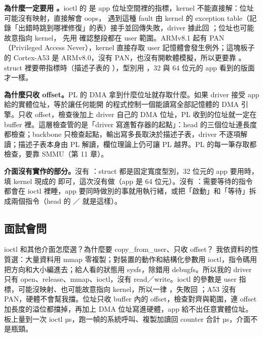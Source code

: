 \textbf{為什麼一定要用 。}ioctl 的  是 app 位址空間裡的指標，kernel 不能直接解：位址可能沒有映射，直接解會 oops， 遇到這種 fault 由 kernel 的 exception table（記錄「出錯時跳到哪裡修復」的表）接手並回傳失敗，driver 據此回 ；位址也可能故意指向 kernel， 先用  確認整段都在 user 範圍。ARMv8.1 起有 PAN（Privileged Access Never），kernel 直接存取 user 記憶體會發生例外；這塊板子的 Cortex-A53 是 ARMv8.0，沒有 PAN，也沒有開軟體模擬，所以更要靠 。struct 裡要帶指標時（描述子表的 ），型別用 ，32 與 64 位元的 app 看到的版面才一樣。

\textbf{為什麼只收 offset。}PL 的 DMA 拿到什麼位址就存取什麼。如果 driver 接受 app 給的實體位址，等於讓任何能開  的程式控制一個能讀寫全部記憶體的 DMA 引擎。只收 offset，檢查後加上 driver 自己的 DMA 位址，PL 收到的位址就一定在 buffer 裡。這層檢查管的是「driver 寫進暫存器的起點」：head 的三個位址連長度都檢查；backbone 只檢查起點，輸出寫多長取決於描述子表，driver 不逐項解讀；描述子表本身由 PL 解讀，欄位理論上仍可讓 PL 越界。PL 的每一筆存取都檢查，要靠 SMMU（第 11 章）。

\textbf{介面沒有實作的部分。}沒有 ：struct 都是固定寬度型別，32 位元的 app 要用時，填 kernel 現成的  即可，這次沒有做（app 是 64 位元）。沒有 ：需要等待的指令都會在 ioctl 裡睡，app 要同時做別的事就用執行緒，或把「啟動」和「等待」拆成兩個指令（head 的 ／ 就是這樣）。

\subsection{面試會問}

\begin{qa}{ioctl 和其他介面怎麼選？為什麼要 copy\_from\_user、只收 offset？}
我依資料的性質選：大量資料用 mmap 零複製；對裝置的動作和結構化參數用 ioctl，指令碼用  把方向和大小編進去；給人看的狀態用 sysfs，除錯用 debugfs。所以我的 driver 只有 open、release、mmap、ioctl，沒有 read／write。ioctl 的參數是 user 指標，可能沒映射、也可能故意指向 kernel，所以一律 ，失敗回 ；A53 沒有 PAN，硬體不會幫我擋。位址只收 buffer 內的 offset，檢查對齊與範圍，連 offset 加長度的溢位都擋掉，再加上 DMA 位址寫進硬體，app 給不出任意實體位址。板上量到一次 ioctl \ioctlUs{} µs，跑一幀的系統呼叫、複製加讀回 counter 合計 \bbSysUs{} µs，介面不是瓶頸。
\end{qa}

